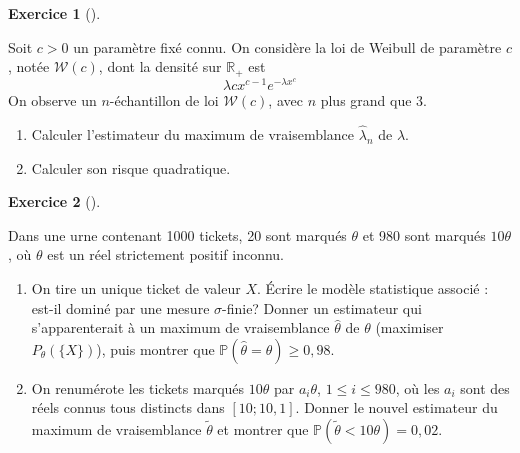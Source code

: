 \documentclass[
  10,
  letterpaper,
  DIV=11,
  numbers=noendperiod]{scrreport}
\providecommand{\tightlist}{%
  \setlength{\itemsep}{0pt}\setlength{\parskip}{0pt}}\usepackage{longtable,booktabs,array}
\theoremstyle{plain}
\theoremstyle{definition}
\newtheorem{exercise}{Exercice}[chapter]
\theoremstyle{plain}
\theoremstyle{definition}
\theoremstyle{definition}
\theoremstyle{plain}
\theoremstyle{remark}
\begin{document}
\begin{exercise}[]\protect\hypertarget{exr-weibullemv}{}\label{exr-weibullemv}

Soit \(c>0\) un paramètre fixé connu. On considère la loi de Weibull de
paramètre \(c\), notée \(\mathscr{W}(c)\), dont la densité sur
\(\mathbb{R}_+\) est \[\lambda c x^{c-1}e^{-\lambda x^c}\] On observe un
\(n\)-échantillon de loi \(\mathscr{W}(c)\), avec \(n\) plus grand que
3.

\begin{enumerate}
\def\labelenumi{\arabic{enumi}.}
\tightlist
\item
  Calculer l'estimateur du maximum de vraisemblance \(\hat \lambda_n\)
  de \(\lambda\).
\item
  Calculer son risque quadratique.
\end{enumerate}

\end{exercise}

\begin{exercise}[]\protect\hypertarget{exr-buse}{}\label{exr-buse}

Dans une urne contenant 1000 tickets, 20 sont marqués \(\theta\) et 980
sont marqués \(10\theta\), où \(\theta\) est un réel strictement positif
inconnu.

\begin{enumerate}
\def\labelenumi{\arabic{enumi}.}
\tightlist
\item
  On tire un unique ticket de valeur \(X\). Écrire le modèle statistique
  associé : est-il dominé par une mesure \(\sigma\)-finie? Donner un
  estimateur qui s'apparenterait à un maximum de vraisemblance
  \(\hat{\theta}\) de \(\theta\) (maximiser \(P_\theta(\{X\})\)), puis
  montrer que \(\mathbb{P}(\hat{\theta}=\theta)\geq 0,98.\)
\item
  On renumérote les tickets marqués \(10\theta\) par \(a_i \theta\),
  \(1 \leq i \leq 980\), où les \(a_i\) sont des réels connus tous
  distincts dans \([10;10,1]\). Donner le nouvel estimateur du maximum
  de vraisemblance \(\tilde{\theta}\) et montrer que
  \(\mathbb{P}(\tilde{\theta}<10 \theta)=0,02.\)
\end{enumerate}

\end{exercise}
\end{document}
